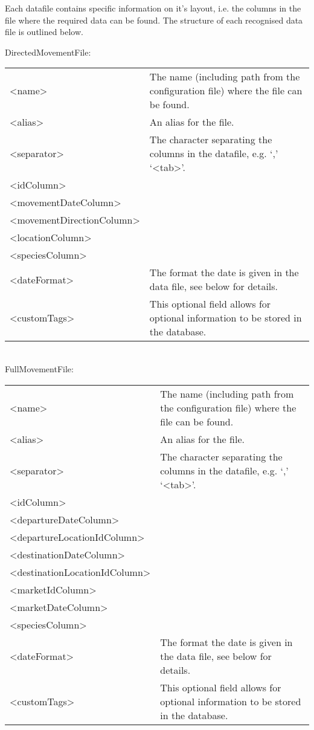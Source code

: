 Each datafile contains specific information on it’s layout, i.e. the columns in the file where the required data can be found. The structure of each recognised data file is outlined below.

DirectedMovementFile:

\begin{tabulary}{0.3\linewidth}{l p{9cm}}
\toprule
<name> & The name (including path from the configuration file) where the file can be found. \\
<alias> & An alias for the file. \\
<separator> & The character separating the columns in the datafile, e.g. `,' `<tab>'.\\
<idColumn> &  \\
<movementDateColumn> &  \\
<movementDirectionColumn> &  \\
<locationColumn> &  \\
<speciesColumn> &  \\
<dateFormat> &  The format the date is given in the data file, see below for details.\\
<customTags> & This optional field allows for optional information to be stored in the database. \\
\bottomrule
\end{tabulary}\\

FullMovementFile:

\begin{tabulary}{1.0\textwidth}{l p{9cm}}
\toprule
<name> & The name (including path from the configuration file) where the file can be found.\\
<alias> & An alias for the file.\\
<separator> & The character separating the columns in the datafile, e.g. `,' `<tab>'.\\
<idColumn> & \\
<departureDateColumn> & \\
<departureLocationIdColumn> & \\
<destinationDateColumn> & \\
<destinationLocationIdColumn> & \\
<marketIdColumn> & \\
<marketDateColumn> & \\
<speciesColumn> & \\
<dateFormat> & The format the date is given in the data file, see below for details.\\
<customTags> & This optional field allows for optional information to be stored in the database.\\
\bottomrule
\end{tabulary}\\

